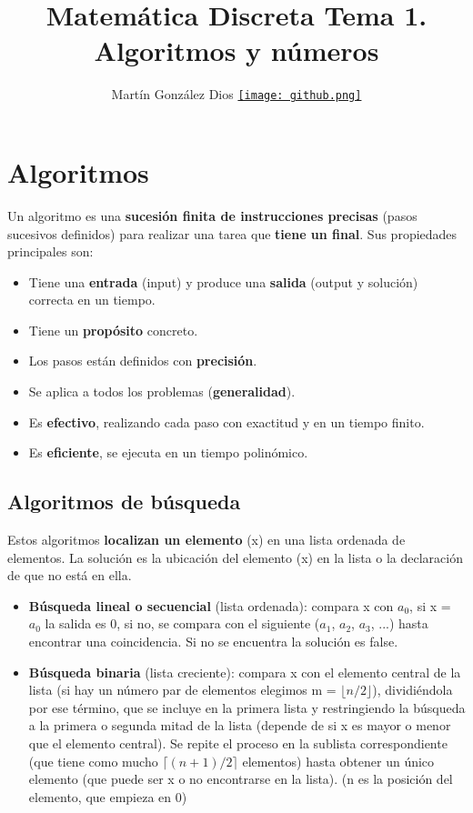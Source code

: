 \documentclass{article}
\title{Matemática Discreta Tema 1. Algoritmos y números}
\author{Martín González Dios 
\href{https://github.com/martindios}{\texttt{[image: github.png]}}}
\begin{document}
\maketitle

\section{Algoritmos}
Un algoritmo es una \textbf{sucesión finita de instrucciones precisas} (pasos sucesivos definidos) para realizar una tarea que \textbf{tiene un final}. Sus propiedades principales son:
\begin{itemize}
    \item Tiene una \textbf{entrada} (input) y produce una \textbf{salida} (output y solución) correcta en un tiempo.
    \item Tiene un \textbf{propósito} concreto.
    \item Los pasos están definidos con \textbf{precisión}.
    \item Se aplica a todos los problemas (\textbf{generalidad}).
    \item Es \textbf{efectivo}, realizando cada paso con exactitud y en un tiempo finito.
    \item Es \textbf{eficiente}, se ejecuta en un tiempo polinómico.
\end{itemize}

\subsection{Algoritmos de búsqueda}
Estos algoritmos \textbf{localizan un elemento} (x) en una lista ordenada de elementos. La solución es la ubicación del elemento (x) en la lista o la declaración de que no está en ella.
\begin{itemize}
    \item \textbf{Búsqueda lineal o secuencial} (lista ordenada): compara x con $a_0$, si x = $a_0$ la salida es 0, si no, se compara con el siguiente ($a_1$, $a_2$, $a_3$, ...) hasta encontrar una coincidencia. Si no se encuentra la solución es false.
    \item \textbf{Búsqueda binaria} (lista creciente): compara x con el elemento central de la lista (si hay un número par de elementos elegimos m = $\lfloor n/2 \rfloor$), dividiéndola por ese término, que se incluye en la primera lista y restringiendo la búsqueda a la primera o segunda mitad de la lista (depende de si x es mayor o menor que el elemento central). Se repite el proceso en la sublista correspondiente (que tiene como mucho $\lceil (n+1)/2 \rceil$ elementos) hasta obtener un único elemento (que puede ser x o no encontrarse en la lista). (n es la posición del elemento, que empieza en 0)
\end{itemize}
\end{document}
